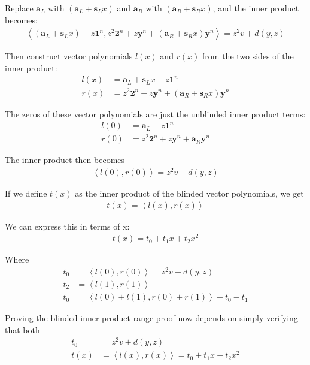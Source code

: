 \documentclass{article}
\begin{document}
Replace $\textbf{a}_L$ with $(\textbf{a}_L + \textbf{s}_L x)$ and $\textbf{a}_R$ with $(\textbf{a}_R + \textbf{s}_R x)$, and the inner product becomes:
\begin{align}
  \left<(\textbf{a}_L + \textbf{s}_L x) - z \textbf{1}^n, z^2 \textbf{2}^n + z \textbf{y}^n + (\textbf{a}_R+ \textbf{s}_R x)\textbf{y}^n\right> = z^2 v + d(y,z)
\end{align}

Then construct vector polynomials $l(x)$ and $r(x)$ from the two sides of the inner product:
\begin{align}
  l(x) &= \textbf{a}_L + \textbf{s}_L x - z \textbf{1}^n\\
  r(x) &= z^2 \textbf{2}^n + z \textbf{y}^n + (\textbf{a}_R+ \textbf{s}_R x) \textbf{y}^n
\end{align}

The zeros of these vector polynomials are just the unblinded inner product terms:
\begin{align}
  l(0) &= \textbf{a}_L - z \textbf{1}^n\\
  r(0) &= z^2 \textbf{2}^n + z \textbf{y}^n + \textbf{a}_R \textbf{y}^n
\end{align}

The inner product then becomes
\begin{align}
  \left<l(0), r(0)\right> = z^2 v + d(y,z)
\end{align}

If we define $t(x)$ as the inner product of the blinded vector polynomials, we get
\begin{align}
  t(x) = \left<l(x), r(x)\right> 
\end{align}

We can express this in terms of x:
\begin{align}
  t(x) = t_0 + t_1 x + t_2 x^2
\end{align}

Where
\begin{align}
  t_0 &= \left<l(0), r(0)\right> = z^2 v + d(y,z)\\
  t_2 &= \left<l(1), r(1)\right>\\
  t_0 &= \left<l(0) + l(1), r(0) + r(1)\right> - t_0 - t_1
\end{align}

Proving the blinded inner product range proof now depends on simply verifying that both 
\begin{align}
  t_0 &= z^2 v + d(y,z)\\
  t(x) &= \left<l(x), r(x)\right> = t_0 + t_1 x + t_2 x^2
\end{align}
\end{document}
